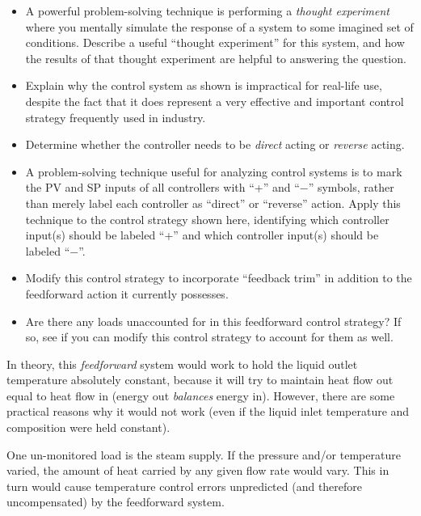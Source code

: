 \begin{itemize}
\item{} A powerful problem-solving technique is performing a {\it thought experiment} where you mentally simulate the response of a system to some imagined set of conditions.  Describe a useful ``thought experiment'' for this system, and how the results of that thought experiment are helpful to answering the question.
\item{} Explain why the control system as shown is impractical for real-life use, despite the fact that it does represent a very effective and important control strategy frequently used in industry.
\item{} Determine whether the controller needs to be {\it direct} acting or {\it reverse} acting.
\item{} A problem-solving technique useful for analyzing control systems is to mark the PV and SP inputs of all controllers with ``+'' and ``$-$'' symbols, rather than merely label each controller as ``direct'' or ``reverse'' action.  Apply this technique to the control strategy shown here, identifying which controller input(s) should be labeled ``+'' and which controller input(s) should be labeled ``$-$''.
\item{} Modify this control strategy to incorporate ``feedback trim'' in addition to the feedforward action it currently possesses.
\item{} Are there any loads unaccounted for in this feedforward control strategy?  If so, see if you can modify this control strategy to account for them as well.
\end{itemize}







In theory, this {\it feedforward} system would work to hold the liquid outlet temperature absolutely constant, because it will try to maintain heat flow out equal to heat flow in (energy out {\it balances} energy in).  However, there are some practical reasons why it would not work (even if the liquid inlet temperature and composition were held constant).







One un-monitored load is the steam supply.  If the pressure and/or temperature varied, the amount of heat carried by any given flow rate would vary.  This in turn would cause temperature control errors unpredicted (and therefore uncompensated) by the feedforward system.

